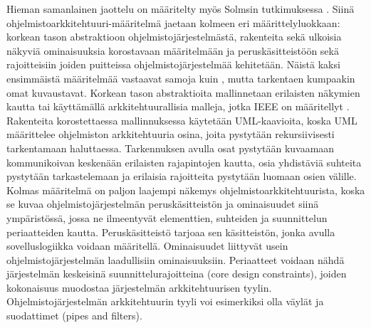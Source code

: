 \documentclass[finnish]{tktltiki2}
\theoremstyle{definition}
\theoremstyle{remark}
\begin{document}
Hieman samanlainen jaottelu on määritelty myös Solmsin tutkimuksessa \citep[s. 368-369]{solms_what_2012}. Siinä ohjelmistoarkkitehtuuri-määritelmä jaetaan kolmeen eri määrittelyluokkaan: korkean tason abstraktioon ohjelmistojärjestelmästä, rakenteita sekä ulkoisia näkyviä ominaisuuksia korostavaan määritelmään ja peruskäsitteistöön sekä rajoitteisiin joiden puitteissa ohjelmistojärjestelmää kehitetään. Näistä kaksi ensimmäistä määritelmää vastaavat samoja kuin \citep[s. 2-7]{gorton_understanding_2011}, mutta tarkentaen kumpaakin omat kuvaustavat. Korkean tason abstraktioita mallinnetaan erilaisten näkymien kautta tai käyttämällä arkkitehtuurallisia malleja, jotka IEEE on määritellyt \citep[s. 4-5]{ieee_2000}. %
Rakenteita korostettaessa mallinnuksessa käytetään UML-kaavioita, koska UML määrittelee ohjelmiston arkkitehtuuria osina, joita pystytään rekursiivisesti tarkentamaan haluttaessa. Tarkennuksen avulla osat pystytään kuvaamaan kommunikoivan keskenään erilaisten rajapintojen kautta, osia yhdistäviä suhteita pystytään tarkastelemaan ja erilaisia rajoitteita pystytään luomaan osien välille. Kolmas määritelmä on paljon laajempi näkemys ohjelmistoarkkitehtuurista, koska se kuvaa ohjelmistojärjestelmän peruskäsitteistön ja ominaisuudet siinä ympäristössä, jossa ne ilmeentyvät elementtien, suhteiden ja suunnittelun periaatteiden kautta. Peruskäsitteistö tarjoaa sen käsitteistön, jonka avulla sovelluslogiikka voidaan määritellä. Ominaisuudet liittyvät usein ohjelmistojärjestelmän laadullisiin ominaisuuksiin. Periaatteet voidaan nähdä järjestelmän keskeisinä suunnittelurajoitteina (core design constraints), joiden kokonaisuus muodostaa järjestelmän arkkitehtuurisen tyylin. Ohjelmistojärjestelmän arkkitehtuurin tyyli voi esimerkiksi olla väylät ja suodattimet (pipes and filters). %
\end{document}
